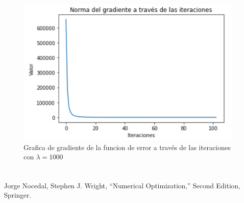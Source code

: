\documentclass[conference]{IEEEtran}
\begin{document}
\begin{figure}[htbp]
    \centerline{\includegraphics[scale=0.25]{r1000g.png}}
    \caption{Grafica de gradiente de la funcion de error a través de las iteraciones con $\lambda=1000$}
    \label{r1000g}
\end{figure}

\section*{}

\begin{thebibliography}{00}
 Jorge Nocedal, Stephen J. Wright, ``Numerical Optimization,'' Second Edition, Springer.
\end{thebibliography}
\end{document}
